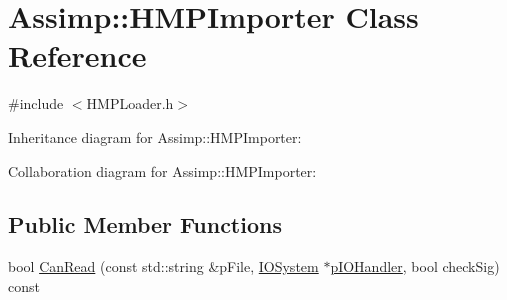 \hypertarget{class_assimp_1_1_h_m_p_importer}{\section{Assimp\+:\+:H\+M\+P\+Importer Class Reference}
\label{class_assimp_1_1_h_m_p_importer}
}


{\ttfamily \#include $<$H\+M\+P\+Loader.\+h$>$}



Inheritance diagram for Assimp\+:\+:H\+M\+P\+Importer\+:


Collaboration diagram for Assimp\+:\+:H\+M\+P\+Importer\+:
\subsection*{Public Member Functions}
\begin{DoxyCompactItemize}
\item 
bool \hyperlink{class_assimp_1_1_h_m_p_importer_a075e2f0b6747922b72ac2b5b19b291ce}{Can\+Read} (const std\+::string \&p\+File, \hyperlink{class_assimp_1_1_i_o_system}{I\+O\+System} $\ast$\hyperlink{class_assimp_1_1_m_d_l_importer_a5799905b6ba533b0f066684b859bc3d5}{p\+I\+O\+Handler}, bool check\+Sig) const 
\end{DoxyCompactItemize}
